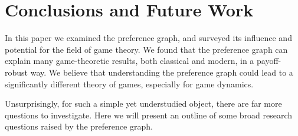 \documentclass[preprint,authoryear]{elsarticle}
\begin{document}
\begin{comment}
There is good reason to suspect that the preference graph should be useful for all FTRL dynamics \citep{biggar_replicator_2023,vlatakis-gkaragkounis_no-regret_2020}.

\subsection{Unsorted}

\begin{itemize}
    \item time-average is not as good as last-iterate \cite{jordan_three_1993}
    \item games that are nearly potential have good convergence \cite{candogan_dynamics_2013}
    \item another dynamics/graphs proposed connection \cite{pangallo_best-response_2021}
\end{itemize}
\end{comment}
\section{Conclusions and Future Work} \label{sec: conclusions}

In this paper we examined the preference graph, and surveyed its influence and potential for the field of game theory. We found that the preference graph can explain many game-theoretic results, both classical and modern, in a payoff-robust way. We believe that understanding the preference graph could lead to a significantly different theory of games, especially for game dynamics.

Unsurprisingly, for such a simple yet understudied object, there are far more questions to investigate. Here we will present an outline of some broad research questions raised by the preference graph.
\end{document}
